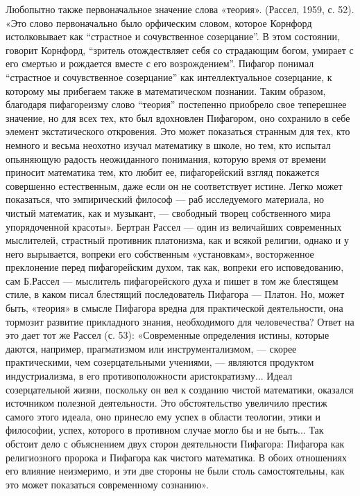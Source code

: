 Любопытно также первоначальное значение слова «теория». (Рассел, 1959,
с.  52).  «Это слово  первоначально  было  орфическим словом,  которое
Корнфорд истолковывает  как ``страстное и  сочувственное созерцание''.
В  этом  состоянии,  говорит Корнфорд,  ``зритель  отождествляет  себя
со  страдающим  богом,  умирает  с  его  смертью  и  рождается  вместе
с  его возрождением''.  Пифагор  понимал  ``страстное и  сочувственное
созерцание'' как интеллектуальное созерцание,  к которому мы прибегаем
также в математическом познании. Таким образом, благодаря пифагореизму
слово  ``теория'' постепенно  приобрело свое  теперешнее значение,  но
для  всех тех,  кто был  вдохновлен  Пифагором, оно  сохранило в  себе
элемент экстатического  откровения. Это может показаться  странным для
тех,  кто  немного  и  весьма  неохотно  изучал  математику  в  школе,
но  тем,  кто  испытал   опьяняющую  радость  неожиданного  понимания,
которую  время  от времени  приносит  математика  тем, кто  любит  ее,
пифагорейский взгляд  покажется совершенно естественным, даже  если он
не  соответствует истине.  Легко  может  показаться, что  эмпирический
философ  ---  раб исследуемого  материала,  но  чистый математик,  как
и  музыкант,  ---  свободный творец  собственного  мира  упорядоченной
красоты».   Бертран  Рассел   ---  один   из  величайших   современных
мыслителей,  страстный противник  платонизма,  как  и всякой  религии,
однако  и у  него  вырывается, вопреки  его собственным  «установкам»,
восторженное преклонение  перед пифагорейским духом, так  как, вопреки
его исповедованию,  сам Б.Рассел  --- мыслитель пифагорейского  духа и
пишет в том же блестящем  стиле, в каком писал блестящий последователь
Пифагора --- Платон. Но, может быть, «теория» в смысле Пифагора вредна
для  практической  деятельности,  она  тормозит  развитие  прикладного
знания, необходимого для человечества? Ответ на это дает тот же Рассел
(с. 53):  «Современные определения  истины, которые  даются, например,
прагматизмом  или  инструментализмом,  --- скорее  практическими,  чем
созерцательными  учениями, ---  являются  продуктом индустриализма,  в
его  противоположности аристократизму...  Идеал созерцательной  жизни,
поскольку  он вел  к созданию  чистой математики,  оказался источником
полезной  деятельности. Это  обстоятельство  увеличило престиж  самого
этого  идеала, оно  принесло ему  успех  в области  теологии, этики  и
философии, успех,  которого в противном  случае могло бы и  не быть...
Так  обстоит дело  с  объяснением двух  сторон деятельности  Пифагора:
Пифагора как религиозного пророка и Пифагора как чистого математика. В
обоих отношениях  его влияние  неизмеримо, и эти  две стороны  не были
столь самостоятельны, как это может показаться современному сознанию».

